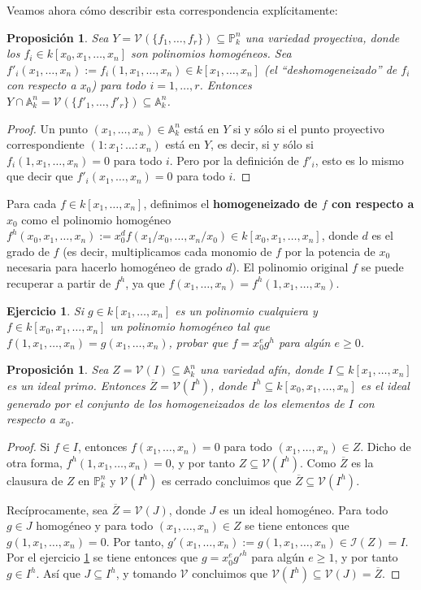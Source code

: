 \documentclass[a4paper,10pt]{book}
\newtheorem{prop}[thm]{Proposición}
\newtheorem{ejercicio}{Ejercicio}[chapter]
\newcommand{\AAA}{\mathbb A}
\newcommand{\PP}{\mathbb P}
\newcommand{\Ank}{\AAA^n_k}
\newcommand{\Pnk}{\PP^n_k}
\newcommand{\II}{{\mathcal I}}
\newcommand{\VV}{{\mathcal V}}
\begin{document}
Veamos ahora cómo describir esta correspondencia explícitamente:

\begin{prop}
 Sea $Y=\VV(\{f_1,\ldots,f_r\})\subseteq\Pnk$ una variedad proyectiva, donde los $f_i\in k[x_0,x_1,\ldots,x_n]$ son polinomios homogéneos. Sea $f'_i(x_1,\ldots,x_n):=f_i(1,x_1,\ldots,x_n)\in k[x_1,\ldots,x_n]$ (el ``deshomogeneizado'' de $f_i$ con respecto a $x_0$) para todo $i=1,\ldots,r$. Entonces $Y\cap\Ank=\VV(\{f'_1,\ldots,f'_r\})\subseteq\Ank$.
\end{prop}

\begin{proof}
 Un punto $(x_1,\ldots,x_n)\in\Ank$ está en $Y$ si y sólo si el punto proyectivo correspondiente $(1:x_1:\ldots:x_n)$ está en $Y$, es decir, si y sólo si $f_i(1,x_1,\ldots,x_n)=0$ para todo $i$. Pero por la definición de $f'_i$, esto es lo mismo que decir que $f'_i(x_1,\ldots,x_n)=0$ para todo $i$.
\end{proof}

Para cada $f\in k[x_1,\ldots,x_n]$, definimos el {\bf homogeneizado de $f$ con respecto a $x_0$} como el polinomio homogéneo $f^h(x_0,x_1,\ldots,x_n):=x_0^df(x_1/x_0,\ldots,x_n/x_0)\in k[x_0,x_1,\ldots,x_n]$, donde $d$ es el grado de $f$ (es decir, multiplicamos cada monomio de $f$ por la potencia de $x_0$ necesaria para hacerlo homogéneo de grado $d$). El polinomio original $f$ se puede recuperar a partir de $f^h$, ya que $f(x_1,\ldots,x_n)=f^h(1,x_1,\ldots,x_n)$.

\begin{ejercicio}\label{homodeshomo}
 Si $g\in k[x_1,\ldots,x_n]$ es un polinomio cualquiera y $f\in k[x_0,x_1,\ldots,x_n]$ un polinomio homogéneo tal que $f(1,x_1,\ldots,x_n)=g(x_1,\ldots,x_n)$, probar que $f=x_0^eg^h$ para algún $e\geq 0$. 
\end{ejercicio}


\begin{prop}
 Sea $Z=\VV(I)\subseteq\Ank$ una variedad afín, donde $I\subseteq k[x_1,\ldots,x_n]$ es un ideal primo. Entonces $\overline Z=\VV(I^h)$, donde $I^h\subseteq k[x_0,x_1,\ldots,x_n]$ es el ideal generado por el conjunto de los homogeneizados de los elementos de $I$ con respecto a $x_0$.
\end{prop}

\begin{proof}
 Si $f\in I$, entonces $f(x_1,\ldots,x_n)=0$ para todo $(x_1,\ldots,x_n)\in Z$. Dicho de otra forma, $f^h(1,x_1,\ldots,x_n)=0$, y por tanto $Z\subseteq\VV(I^h)$. Como $\overline Z$ es la clausura de $Z$ en $\Pnk$ y $\VV(I^h)$ es cerrado concluimos que $\overline Z\subseteq\VV(I^h)$. 

Recíprocamente, sea $\overline Z=\VV(J)$, donde $J$ es un ideal homogéneo. Para todo $g\in J$ homogéneo y para todo $(x_1,\ldots,x_n)\in Z$ se tiene entonces que $g(1,x_1,\ldots,x_n)=0$. Por tanto, $g'(x_1,\ldots,x_n):=g(1,x_1,\ldots,x_n)\in\II(Z)=I$. Por el ejercicio \ref{homodeshomo} se tiene entonces que $g=x_0^eg'^h$ para algún $e\geq 1$, y por tanto $g\in I^h$. Así que $J\subseteq I^h$, y tomando $\VV$ concluimos que $\VV(I^h)\subseteq\VV(J)=\overline Z$.
\end{proof}
\end{document}
